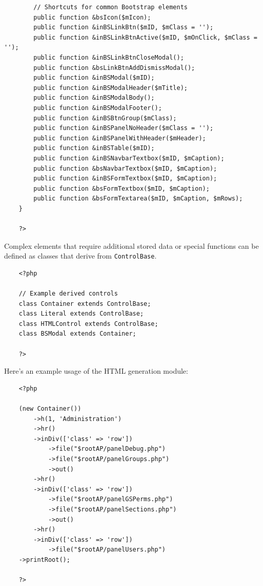 \documentclass[12pt]{report}
\begin{document}
\begin{verbatim}
        // Shortcuts for common Bootstrap elements
        public function &bsIcon($mIcon);
        public function &inBSLinkBtn($mID, $mClass = '');
        public function &inBSLinkBtnActive($mID, $mOnClick, $mClass = '');
        public function &inBSLinkBtnCloseModal();
        public function &bsLinkBtnAddDismissModal();
        public function &inBSModal($mID);
        public function &inBSModalHeader($mTitle);
        public function &inBSModalBody();
        public function &inBSModalFooter();
        public function &inBSBtnGroup($mClass);
        public function &inBSPanelNoHeader($mClass = '');
        public function &inBSPanelWithHeader($mHeader);
        public function &inBSTable($mID);
        public function &inBSNavbarTextbox($mID, $mCaption);
        public function &bsNavbarTextbox($mID, $mCaption);
        public function &inBSFormTextbox($mID, $mCaption);
        public function &bsFormTextbox($mID, $mCaption);
        public function &bsFormTextarea($mID, $mCaption, $mRows);
    }

    ?>
                    \end{verbatim}            

                    Complex elements that require additional stored data or special functions can be defined as classes that derive from \texttt{ControlBase}.

                    \begin{verbatim}
    <?php

    // Example derived controls
    class Container extends ControlBase;
    class Literal extends ControlBase;
    class HTMLControl extends ControlBase;
    class BSModal extends Container;

    ?>
                    \end{verbatim}               

                    Here's an example usage of the HTML generation module:

                    \begin{verbatim}
    <?php 

    (new Container())
        ->h(1, 'Administration')
        ->hr()
        ->inDiv(['class' => 'row'])
            ->file("$rootAP/panelDebug.php")
            ->file("$rootAP/panelGroups.php")
            ->out()
        ->hr()
        ->inDiv(['class' => 'row'])
            ->file("$rootAP/panelGSPerms.php")
            ->file("$rootAP/panelSections.php")
            ->out()
        ->hr()
        ->inDiv(['class' => 'row'])
            ->file("$rootAP/panelUsers.php")
    ->printRoot();

    ?>
                    \end{verbatim}           
\end{document}

